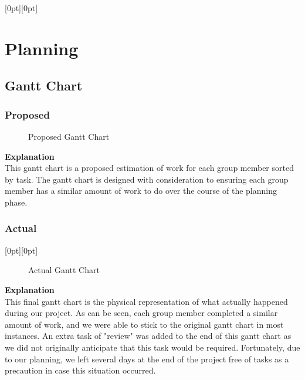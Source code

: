 \documentclass[a4paper]{article}
\newcommand{\Lpagenumber}{\ifdim\textwidth=\linewidth\else\bgroup
  \thispagestyle{empty}
  \dimendef\margin=0
  \ifodd\value{page}\margin=\oddsidemargin
  \else\margin=\evensidemargin
  \fi
  \raisebox{\dimexpr -\topmargin-\headheight-\headsep-0.5\linewidth}[0pt][0pt]{%
    \rlap{\hspace{\dimexpr \margin+\textheight+\footskip}%
    \llap{\rotatebox{0}{\thepage}}}}%
\egroup\fi}
\begin{document}
\begin{landscape}
\Lpagenumber
\section{Planning}
\subsection{Gantt Chart}
\subsubsection{Proposed}
\begin{figure}[!ht]
    \centering
    \caption{Proposed Gantt Chart}
    \label{fig:proposed_gantt}
\end{figure}

\textbf{Explanation} \\
This gantt chart is a proposed estimation of work for each group member sorted by task. The gantt chart is designed with consideration to ensuring each group member has a similar amount of work to do over the course of the planning phase.

\clearpage
\subsubsection{Actual}
\Lpagenumber
\begin{figure}[!ht]
    \centering
    \caption{Actual Gantt Chart}
    \label{fig:actual_gantt}
\end{figure}

\textbf{Explanation} \\
This final gantt chart is the physical representation of what actually happened during our project. As can be seen, each group member completed a similar amount of work, and we were able to stick to the original gantt chart in most instances. An extra task of "review" was added to the end of this gantt chart as we did not originally anticipate that this task would be required. Fortunately, due to our planning, we left several days at the end of the project free of tasks as a precaution in case this situation occurred.

\end{landscape}
\end{document}
